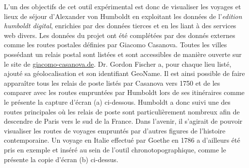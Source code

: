 \documentclass[a4paper, 12pt, twoside]{book}
\begin{document}
L'un des objectifs de cet outil expérimental est donc de visualiser les voyages et lieux de séjour d'Alexander von Humboldt en exploitant les données de l'\textit{edition humboldt digital}, enrichies par des données tierces et en les liant à des services web divers. Les données du projet ont été complétées par des donnés externes comme les routes postales définies par Giacomo Casanova. Toutes les villes possédant un relais postal sont listées et sont accessibles de manière ouverte sur le site de \href{https://giacomo-casanova.de/posten.htm}{giacomo-casanova.de}. Dr. Gordon Fischer a, pour chaque lieu listé, ajouté sa géolocalisation et son identifiant GeoName. Il est ainsi possible de faire apparaître tous les relais de poste listés par Casanova vers 1750 et de les comparer avec les routes empruntées par Humboldt lors de ses itinéraires comme le présente la capture d'écran (a) ci-dessous. Humboldt a donc suivi une des routes principales où les relais de poste sont particulièrement nombreux afin de descendre de Paris vers le sud de la France. 
Dans l'avenir, il s'agirait de pouvoir visualiser les routes de voyages empruntés par d'autres figures de l'histoire contemporaine. Un voyage en Italie effectué par Goethe en 1786 a d'ailleurs été pris en exemple et inséré au sein de l'outil chronotopographique, comme le présente la copie d'écran (b) ci-dessus. 
\end{document}
